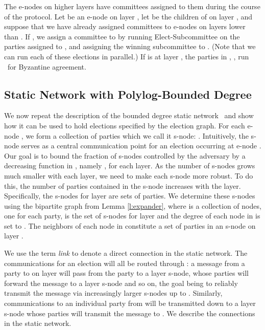 \documentclass[11pt,letter]{article}
\theoremstyle{mytheoremstyle}
\newcommand{\es}{\mbox{\textsf{Elect-Subcommittee}}\xspace}
\begin{document}
\begin{description}
{The \textsf{e-node}s on higher layers have committees assigned to them during the course of the protocol. Let  be an \textsf{e-node} on layer , let  be the children of  on layer , and suppose that we have already assigned committees to \textsf{e-node}s on layers lower than . If , we assign a committee to  by running \es on the parties assigned to , and assigning the winning subcommittee to . (Note that we can run each of these elections in parallel.)  If  is at layer , the parties in , , run \heavyba\ for Byzantine agreement.

\subsection{Static Network with Polylog-Bounded Degree} \label{s: static network}

We now repeat the description of the bounded degree static network~\cite{King:2006:TSS:1170136.1170491} and show how it can be used to hold elections specified by the election graph. For each \textsf{e-node} , we form a collection of parties which we call it \textsf{s-node}: . Intuitively, the \textsf{s-node}  serves as a central communication point for an election occurring at \textsf{e-node} . 
Our goal is to bound the fraction of \textsf{s-node}s controlled by the adversary by a decreasing function in , namely , for each layer. As the number of \textsf{s-node}s grows much smaller with each layer, we need to make each \textsf{s-node} more robust. To do this, the number of parties contained in the \textsf{s-node} increases with the layer. Specifically, the \textsf{s-node}s for layer  are sets of  parties. We determine these \textsf{s-node}s using the bipartite graph from Lemma \ref{l:expander}, where  is a collection of  nodes, one for each party,  is the set of \textsf{s-node}s for layer  and the degree of each node in  is set to . The neighbors of each node in  constitute a set of parties in an \textsf{s-node} on layer .

We use the term {\em link} to denote a direct connection in the static network. The communications for an election  will all be routed through : a message from a party  to  on layer  will pass from the party to a layer  \textsf{s-node}, whose parties will forward the message to a layer  \textsf{s-node} and so on, the goal being to reliably transmit the message via increasingly larger \textsf{s-node}s up to .
Similarly, communications to an individual party  from  will be transmitted down to a layer  \textsf{s-node} whose parties will transmit the message to . We describe the connections in the static network.

}
\end{description}
\end{document}
